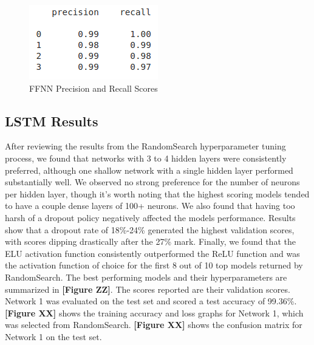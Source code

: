 \documentclass{article}
\begin{document}
\begin{figure}[!htb]
\caption{FFNN Precision and Recall Scores}
\centering
\includegraphics[scale=0.5]{Images/FFNN_prec_rec.png}
\end{figure}

\subsection*{LSTM Results}
After reviewing the results from the RandomSearch hyperparameter tuning process, we found that networks with 3 to 4 hidden layers were consistently preferred, although one shallow network with a single hidden layer performed substantially well. We observed no strong preference for the number of neurons per hidden layer, though it’s worth noting that the highest scoring models tended to have a couple dense layers of 100+ neurons. We also found that having too harsh of a dropout policy negatively affected the models performance. Results show that a dropout rate of 18\%-24\% generated the highest validation scores, with scores dipping drastically after the 27\% mark. Finally, we found that the ELU activation function consistently outperformed the ReLU function and was the activation function of choice for the first 8 out of 10 top models returned by RandomSearch. The best performing models and their hyperparameters are summarized in \textbf{[Figure ZZ]}. The scores reported are their validation scores. Network 1 was evaluated on the test set and scored a test accuracy of 99.36\%. \textbf{[Figure XX]} shows the training accuracy and loss graphs for Network 1, which was selected from RandomSearch. \textbf{[Figure XX]} shows the confusion matrix for Network 1 on the test set. 
\end{document}
